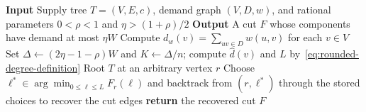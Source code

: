 \begin{algorithm}[H]
    \caption{Direct degree-budget dynamic program}
    \textbf{Input} Supply tree $T=(V,E,c)$, demand graph $(V,D,w)$, and rational parameters $0<\rho<1$ and $\eta>(1+\rho)/2$\;
    \textbf{Output} A cut $F$ whose components have demand at most $\eta W$\;
    Compute $d_w(v)=\sum_{uv\in D}w(u,v)$ for each $v\in V$\;
    Set $\Delta\gets(2\eta-1-\rho)W$ and $K\gets\Delta/n$; compute $\widehat d(v)$ and $L$ by~\eqref{eq:rounded-degree-definition}\;
    Root $T$ at an arbitrary vertex $r$\;
    Choose $\ell^*\in\arg\min_{0\leq\ell\leq L}F_r(\ell)$ and backtrack from $(r,\ell^*)$ through the stored choices to recover the cut edges\;
    \textbf{return} the recovered cut $F$\;
\end{algorithm}
